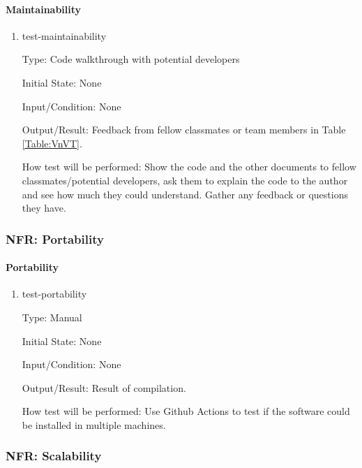\documentclass[12pt, titlepage]{article}
\begin{document}
\paragraph{Maintainability}

\begin{enumerate}

\item{test-maintainability}

Type: Code walkthrough with potential developers
					
Initial State: None
					
Input/Condition: None
					
Output/Result: Feedback from fellow classmates or team members in Table \ref{Table:VnVT}.				
	
How test will be performed: Show the code and the other documents to fellow classmates/potential developers, ask them to explain the code to the author and see how much they could understand. Gather any feedback or questions they have.
\end{enumerate}

		
\subsubsection{NFR: Portability}\label{t_portability}
		
\paragraph{Portability}

\begin{enumerate}

\item{test-portability}

Type: Manual
					
Initial State: None
					
Input/Condition: None
					
Output/Result: Result of compilation.
					
How test will be performed: Use Github Actions to test if the software could be installed in multiple machines.

\end{enumerate}
		
\subsubsection{NFR: Scalability}\label{t_scalability}
		
\end{document}
